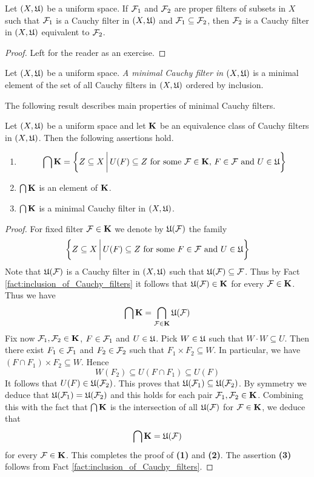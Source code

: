 \begin{fact}\label{fact:inclusion_of_Cauchy_filters}
Let $(X,{\mathfrak U})$ be a uniform space. If ${\mathcal F}_1$ and ${\mathcal F}_2$ are proper filters of subsets in $X$ such that ${\mathcal F}_1$ is a Cauchy filter in $(X,{\mathfrak U})$ and ${\mathcal F}_1 \subseteq {\mathcal F}_2$, then ${\mathcal F}_2$ is a Cauchy filter in $(X,{\mathfrak U})$ equivalent to ${\mathcal F}_2$.
\end{fact}
\begin{proof}
Left for the reader as an exercise.
\end{proof}

\begin{definition}
Let $(X,{\mathfrak U})$ be a uniform space. \textit{A minimal Cauchy filter in $(X,{\mathfrak U})$} is a minimal element of the set of all Cauchy filters in $(X,{\mathfrak U})$ ordered by inclusion.  
\end{definition}
\noindent
The following result describes main properties of minimal Cauchy filters.

\begin{theorem}\label{theorem:minimal_Cauchy_filters}
Let $(X,{\mathfrak U})$ be a uniform space and let $\mathbf{K}$ be an equivalence class of Cauchy filters in $(X,{\mathfrak U})$. Then the following assertions hold.
\begin{enumerate}[label=\emph{\textbf{(\arabic*)}}, leftmargin=*]
\item $$\bigcap \mathbf{K} = \bigg\{Z\subseteq X\,\bigg|\,U(F)\subseteq Z\mbox{ for some }{\mathcal F} \in \mathbf{K},\,F \in {\mathcal F}\mbox{ and }U \in {\mathfrak U}\bigg\}$$
\item $\bigcap \mathbf{K}$ is an element of $\mathbf{K}$.
\item $\bigcap \mathbf{K}$ is a minimal Cauchy filter in $(X,{\mathfrak U})$.
\end{enumerate}
\end{theorem}
\begin{proof}
For fixed filter ${\mathcal F} \in \mathbf{K}$ we denote by ${\mathfrak U}({\mathcal F})$ the family
$$\bigg\{Z\subseteq X\,\bigg|\,U(F)\subseteq Z\mbox{ for some }F \in {\mathcal F}\mbox{ and }U \in {\mathfrak U}\bigg\}$$
Note that ${\mathfrak U}({\mathcal F})$ is a Cauchy filter in $(X,{\mathfrak U})$ such that ${\mathfrak U}({\mathcal F})\subseteq {\mathcal F}$. Thus by Fact \ref{fact:inclusion_of_Cauchy_filters} it follows that ${\mathfrak U}({\mathcal F}) \in \mathbf{K}$ for every ${\mathcal F} \in \mathbf{K}$. Thus we have
$$\bigcap \mathbf{K} = \bigcap_{{\mathcal F} \in \mathbf{K}}{\mathfrak U}({\mathcal F})$$
Fix now ${\mathcal F}_1,{\mathcal F}_2\in \mathbf{K}$, $F\in {\mathcal F}_1$ and $U \in {\mathfrak U}$. Pick $W \in {\mathfrak U}$ such that $W\cdot W\subseteq U$. Then there exist $F_1 \in {\mathcal F}_1$ and $F_2\in {\mathcal F}_2$ such that $F_1\times F_2 \subseteq W$. In particular, we have $\left(F\cap F_1\right)\times F_2 \subseteq W$. Hence 
$$W(F_2)\subseteq U\left(F\cap F_1\right) \subseteq U(F)$$
It follows that $U(F) \in {\mathfrak U}({\mathcal F}_2)$. This proves that ${\mathfrak U}({\mathcal F}_1)\subseteq {\mathfrak U}({\mathcal F}_2)$. By symmetry we deduce that ${\mathfrak U}({\mathcal F}_1) = {\mathfrak U}({\mathcal F}_2)$ and this holds for each pair ${\mathcal F}_1,{\mathcal F}_2\in \mathbf{K}$. Combining this with the fact that $\bigcap \mathbf{K}$ is the intersection of all ${\mathfrak U}({\mathcal F})$ for ${\mathcal F} \in \mathbf{K}$, we deduce that
$$\bigcap \mathbf{K} = {\mathfrak U}({\mathcal F})$$
for every ${\mathcal F} \in \mathbf{K}$. This completes the proof of \textbf{(1)} and \textbf{(2)}. The assertion \textbf{(3)} follows from Fact \ref{fact:inclusion_of_Cauchy_filters}.
\end{proof}

